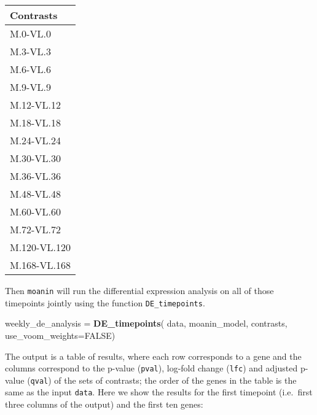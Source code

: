 \documentclass[9pt,a4paper,]{extarticle}
\newenvironment{Shaded}{\begin{snugshade}}{\end{snugshade}}
\newcommand{\DataTypeTok}[1]{\textcolor[rgb]{0.13,0.29,0.53}{#1}}
\newcommand{\KeywordTok}[1]{\textcolor[rgb]{0.13,0.29,0.53}{\textbf{#1}}}
\newcommand{\NormalTok}[1]{#1}
\newcommand{\OtherTok}[1]{\textcolor[rgb]{0.56,0.35,0.01}{#1}}
\newcommand{\StringTok}[1]{\textcolor[rgb]{0.31,0.60,0.02}{#1}}
\begin{document}
\begin{tabular}{l}
\toprule
Contrasts\\
\midrule
M.0-VL.0\\
M.3-VL.3\\
M.6-VL.6\\
M.9-VL.9\\
M.12-VL.12\\
\addlinespace
M.18-VL.18\\
M.24-VL.24\\
M.30-VL.30\\
M.36-VL.36\\
M.48-VL.48\\
\addlinespace
M.60-VL.60\\
M.72-VL.72\\
M.120-VL.120\\
M.168-VL.168\\
\bottomrule
\end{tabular}

Then \texttt{moanin} will run the differential expression analysis on all of those timepoints
jointly using the function \texttt{DE\_timepoints}.

\begin{Shaded}
\begin{Highlighting}[]
\NormalTok{weekly_de_analysis =}\StringTok{ }\KeywordTok{DE_timepoints}\NormalTok{(}
\NormalTok{     data, moanin_model, contrasts,}
     \DataTypeTok{use_voom_weights=}\OtherTok{FALSE}\NormalTok{)}
\end{Highlighting}
\end{Shaded}

The output is a table of results, where each row corresponds to a gene and the
columns correspond to the p-value (\texttt{pval}), log-fold change (\texttt{lfc}) and
adjusted p-value (\texttt{qval}) of the sets of contrasts; the order of the genes in
the table is the same as the input \texttt{data}. Here we show the results for the
first timepoint (i.e.~first three columns of the output) and the first ten
genes:
\end{document}
